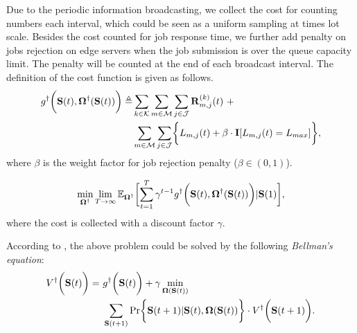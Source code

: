Due to the periodic information broadcasting, we collect the cost for counting numbers each interval, which could be seen as a uniform sampling at times lot scale.
Besides the cost counted for job response time, we further add penalty on jobs rejection on edge servers when the job submission is over the queue capacity limit. The penalty will be counted at the end of each broadcast interval.
The definition of the cost function is given as follows.
\begin{align}
    g^{\dagger}\Paren{\Stat({t}), \Policy^{\dagger}(\Stat({t}))} \define
        &\sum_{k\in\apSet} \sum_{m\in\esSet} \sum_{j\in\jSpace} \vec{R}^{(k)}_{m,j}({t})~+
        \nonumber\\
        &\sum_{m\in\esSet} \sum_{j\in\jSpace} \Brace{L_{m,j}({t}) + \beta \cdot \mat{I}[L_{m,j}({t})=L_{max}]},
\end{align}
where $\beta$ is the weight factor for job rejection penalty ($\beta \in (0,1)$).

\begin{problem}
    \begin{align}
        \min_{\Policy^{\dagger}} \lim_{T \to \infty}
            \mathbb{E}_{\Policy^{\dagger}}
                \Bracket{\sum_{t=1}^{T} \gamma^{t-1} g^{\dagger}\Paren{\Stat({t}), \Policy^{\dagger}(\Stat({t}))}|\Stat(1)},
    \end{align}
    where the cost is collected with a discount factor $\gamma$.
\end{problem}
According to \cite{sutton1998introduction}, the above problem could be solved by the following \emph{Bellman's equation}:
\begin{align}
    V^{\dagger}\Paren{\Stat({t})} =~&g^{\dagger}\Paren{\Stat({t})} + \gamma \min_{\Policy(\Stat({t}))}
        \nonumber\\
        &\sum_{\Stat({t+1})} \Pr\Brace{ \Stat({t+1})|\Stat({t}), \Policy(\Stat({t})) } \cdot V^{\dagger}\Paren{\Stat({t+1})}.
    \label{sp_0}
\end{align}

